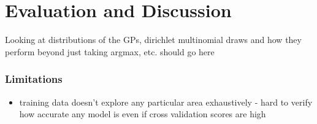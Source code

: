 \chapter{Evaluation and Discussion} \label{chap:evaluation}

 Looking at distributions of the GPs, dirichlet multinomial draws and how they perform beyond just taking argmax, etc. should go here

\subsection{Limitations}

\begin{itemize}
    \item training data doesn't explore any particular area exhaustively - hard to verify how accurate any model is even if cross validation scores are high
\end{itemize}
